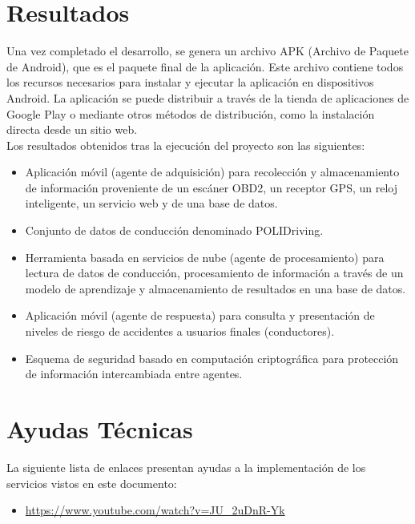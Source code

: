 \documentclass[a4paper,10pt, oneside, titlepage]{article}
\begin{document}
	\section{Resultados}\label{Resultados}
	Una vez completado el desarrollo, se genera un archivo APK (Archivo de Paquete de Android), que es el paquete final de la aplicación. Este archivo contiene todos los recursos necesarios para instalar y ejecutar la aplicación en dispositivos Android. La aplicación se puede distribuir a través de la tienda de aplicaciones de Google Play o mediante otros métodos de distribución, como la instalación directa desde un sitio web. \\\newline
	\indent Los resultados obtenidos tras la ejecución del proyecto son las siguientes:
	\begin{itemize}
		\item Aplicación móvil (agente de adquisición) para recolección y almacenamiento de información proveniente de un escáner OBD2, un receptor GPS, un reloj inteligente, un servicio web y de una base de datos.
		\item Conjunto de datos de conducción denominado POLIDriving.
		\item Herramienta basada en servicios de nube (agente de procesamiento) para lectura de datos de conducción, procesamiento de información a través de un modelo de aprendizaje y almacenamiento de resultados en una base de datos.
		\item Aplicación móvil (agente de respuesta) para consulta y presentación de niveles de riesgo de accidentes a usuarios finales (conductores).
		\item Esquema de seguridad basado en computación criptográfica para protección de información intercambiada entre agentes.
	\end{itemize}
	
	\section{Ayudas Técnicas}\label{Ayudas_Tecnicas}
	La siguiente lista de enlaces presentan ayudas a la implementación de los servicios vistos en este documento:
	\begin{itemize}
		\item \textcolor{blue}{\url{https://www.youtube.com/watch?v=JU_2uDnR-Yk}}
	\end{itemize}
		
	
	
\end{document}
